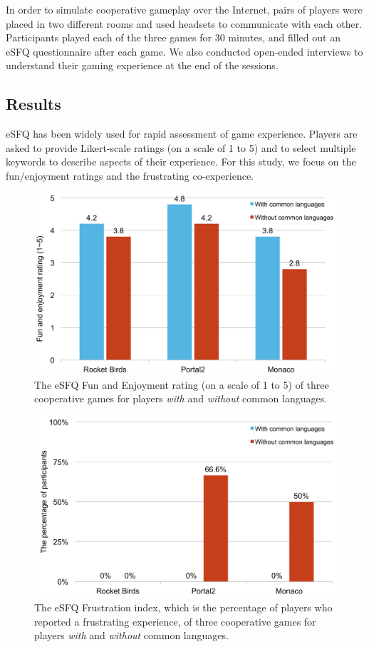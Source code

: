 In order to simulate cooperative gameplay over the Internet, pairs of players were placed in two different rooms and used headsets to communicate with each other. Participants played each of the three games for 30 minutes, and filled out an eSFQ\cite{eSFQ} questionnaire after each game. We also conducted open-ended interviews to understand their gaming experience at the end of the sessions. 



\subsection{Results}

eSFQ\cite{eSFQ} has been widely used for rapid assessment of game experience. Players are asked to provide Likert-scale ratings (on a scale of 1 to 5) and to select multiple keywords to describe aspects of their experience. 
For this study, we focus on the fun/enjoyment ratings and the frustrating co-experience. 

\begin{figure}[!t]
\centering
\includegraphics[width=0.9\columnwidth]{Figures/PS_FunAndEnj.pdf}
\caption{The eSFQ Fun and Enjoyment rating (on a scale of 1 to 5) of three cooperative games for players \textit{with} and \textit{without} common languages.}
\label{fig:PS_FunAndEnj}
\end{figure}


\begin{figure}[!t]
\centering
\includegraphics[width=0.9\columnwidth]{Figures/PS_Frus.pdf}
\caption{The eSFQ Frustration index, which is the percentage of players who reported a frustrating experience, of three cooperative games for players \textit{with} and \textit{without} common languages.}
\label{fig:PS_Frus}
\end{figure}




